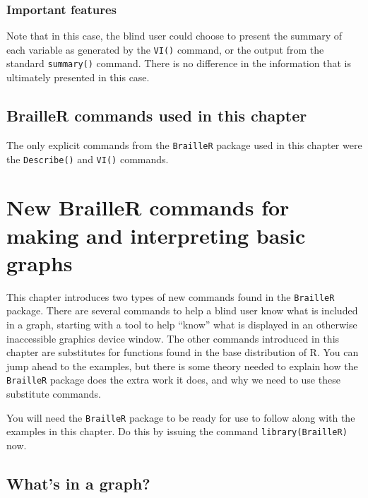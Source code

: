\documentclass[
]{book}
\begin{document}
\hypertarget{important-features-1}{%
\subsection{Important features}\label{important-features-1}}

Note that in this case, the blind user could choose to present the summary of each variable as generated by the \texttt{VI()} command, or the output from the standard \texttt{summary()} command. There is no difference in the information that is ultimately presented in this case.

\hypertarget{brailler-commands-used-in-this-chapter-1}{%
\section{BrailleR commands used in this chapter}\label{brailler-commands-used-in-this-chapter-1}}

The only explicit commands from the \texttt{BrailleR} package used in this chapter were the \texttt{Describe()} and \texttt{VI()} commands.

\hypertarget{NewGraphs}{%
\chapter{New BrailleR commands for making and interpreting basic graphs}\label{NewGraphs}}

This chapter introduces two types of new commands found in the \texttt{BrailleR} package. There are several commands to help a blind user know what is included in a graph, starting with a tool to help ``know'' what is displayed in an otherwise inaccessible graphics device window. The other commands introduced in this chapter are substitutes for functions found in the base distribution of R. You can jump ahead to the examples, but there is some theory needed to explain how the \texttt{BrailleR} package does the extra work it does, and why we need to use these substitute commands.

You will need the \texttt{BrailleR} package to be ready for use to follow along with the examples in this chapter. Do this by issuing the command \texttt{library(BrailleR)} now.

\hypertarget{whats-in-a-graph}{%
\section{What's in a graph?}\label{whats-in-a-graph}}
\end{document}
